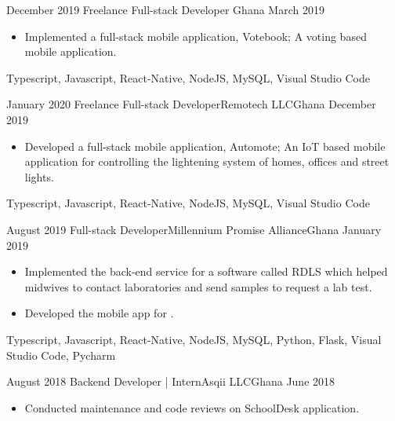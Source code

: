 \begin{experiences}
  
  
    \experience
    {December 2019} {Freelance Full-stack Developer }{}{Ghana}
    {March 2019}    {
                      \begin{itemize}
                        \item Implemented a full-stack mobile application, Votebook; A voting based mobile application.
                      \end{itemize}
                    }
                    {Typescript, Javascript, React-Native, NodeJS, MySQL, Visual Studio Code}
  \emptySeparator
  
  
  
  \experience
    {January 2020}     {Freelance Full-stack Developer}{Remotech LLC}{Ghana}
    {December 2019}    {
                      \begin{itemize}
                        \item Developed a full-stack mobile application, Automote; An IoT based mobile application for controlling the lightening system of homes, offices and street lights.
                      \end{itemize}
                    }
                    {Typescript, Javascript, React-Native, NodeJS, MySQL, Visual Studio Code}
  \emptySeparator
  
  
  
   \experience
    {August 2019}     {Full-stack Developer}{Millennium Promise Alliance}{Ghana}
    {January 2019}    {
                      \begin{itemize}
                        \item Implemented the back-end service for a software called RDLS which helped midwives to contact laboratories and send samples to request a lab test.
                        
                        \item Developed the mobile app for {
                        }.
                      \end{itemize}
                    }
                    {Typescript, Javascript, React-Native, NodeJS, MySQL, Python, Flask, Visual Studio Code, Pycharm}
  \emptySeparator
 
 
  \experience
    {August 2018}     {Backend Developer | Intern}{Asqii LLC}{Ghana}
    {June 2018}    {
                      \begin{itemize}
                        \item Conducted maintenance and code reviews on SchoolDesk application.
                        

\end{itemize}}
\end{experiences}
